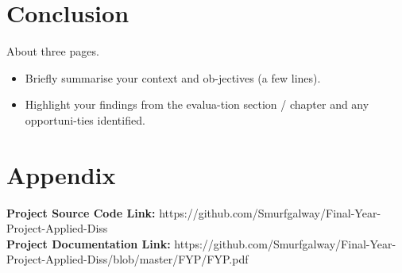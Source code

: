 \chapter{Conclusion}
About three pages.

\begin{itemize}
\item Briefly summarise your context and ob-jectives (a few lines).
\item Highlight your findings from the evalua-tion section / chapter and any opportuni-ties identified.
\end{itemize}

\chapter{Appendix}
\textbf{Project Source Code Link: } https://github.com/Smurfgalway/Final-Year-Project-Applied-Diss \\
\textbf{Project Documentation Link: } https://github.com/Smurfgalway/Final-Year-Project-Applied-Diss/blob/master/FYP/FYP.pdf\\

